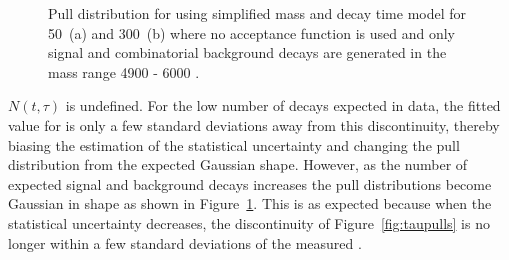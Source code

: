 {\begin{figure}[tbp]
\begin{subfigure}[b]{0.48\textwidth}
   \end{subfigure}
    \caption{Pull distribution for \tmumu using simplified mass and decay time model for 50~\fb (a) and 300~\fb (b) where no acceptance function is used and only signal and combinatorial background decays are generated in the mass range 4900 - 6000 \mevcc.}
    \label{fig:morestatstaupulls}
\end{figure}

\clearpage 

\noindent $N(t, \tau)$ is undefined. %
For the low number of \bsmumu decays expected in data, the fitted value for \tmumu is only a few standard deviations away from this discontinuity, thereby biasing the estimation of the statistical uncertainty and changing the pull distribution from the expected Gaussian shape. However, as the number of expected signal and background decays increases the \tmumu pull distributions become Gaussian in shape as shown in Figure~\ref{fig:morestatstaupulls}. This is as expected because when the statistical uncertainty decreases, the discontinuity of Figure~\ref{fig:taupulls} is no longer within a few standard deviations of the measured \tmumu.

}
